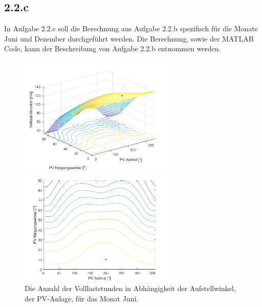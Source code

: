 \documentclass[a4paper,12pt]{article}
\begin{document}
	\subsection{2.2.c}
	In Aufgabe 2.2.c soll die Berechnung aus Aufgabe 2.2.b spezifisch für die Monate Juni und Dezember durchgeführt werden.\newline
	Die Berechnung, sowie der MATLAB Code, kann der Beschreibung von Aufgabe 2.2.b entnommen werden.\newline
	\begin{figure}[H]
		\centering
		\begin{minipage}[b]{0.4\textwidth}
			\centering
			\includegraphics[width=7.5cm]{img/results/VolllaststundenAbhaengigVomWinkelJuni}
		\end{minipage}
		\hfill
		\begin{minipage}[b]{0.4\textwidth}
			\centering
			\includegraphics[width=7.5cm]{img/results/VolllaststundenAbhaengigVomWinkelContourJuni}
		\end{minipage}
		\caption{Die Anzahl der Volllaststunden in Abhängigkeit der Aufstellwinkel, der PV-Anlage, für das Monat Juni.}
	\end{figure}
\end{document}
